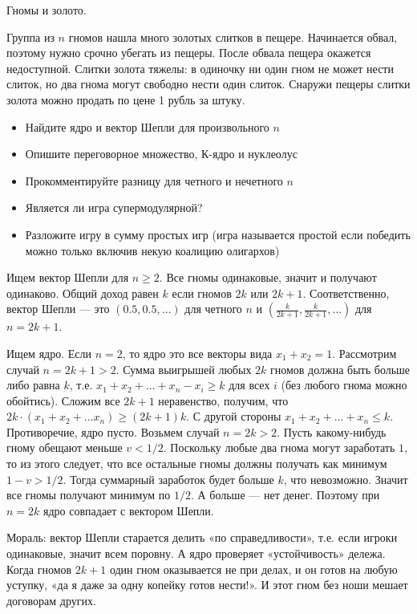 \begin{problem}
Гномы и золото.

 Группа из $n$ гномов нашла много золотых слитков в пещере. Начинается обвал, поэтому нужно срочно убегать из пещеры. После обвала пещера окажется недоступной. Слитки золота тяжелы: в одиночку ни один гном не может нести слиток, но два гнома могут свободно нести один слиток. Снаружи пещеры слитки золота можно продать по цене 1 рубль за штуку.
\begin{itemize}
\item Найдите ядро и вектор Шепли для произвольного $n$
\item Опишите переговорное множество, К-ядро и нуклеолус
\item Прокомментируйте разницу для четного и нечетного $n$
\item Является ли игра супермодулярной?
\item Разложите игру в сумму простых игр (игра называется простой если победить можно только включив некую коалицию олигархов)
\end{itemize}




\begin{sol}
Ищем вектор Шепли для $n\geq 2$. Все гномы одинаковые, значит и получают одинаково. Общий доход равен $k$ если гномов $2k$ или $2k+1$. Соответственно, вектор Шепли — это $(0.5,0.5,\ldots )$ для четного $n$ и $(\frac{k}{2k+1},\frac{k}{2k+1},\ldots )$ для $n=2k+1$.

Ищем ядро. Если $n=2$, то ядро это все векторы вида $x_{1}+x_{2}=1$. Рассмотрим случай $n=2k+1>2$. Сумма выигрышей любых $2k$ гномов должна быть больше либо равна $k$, т.е. $x_{1}+x_{2}+\ldots +x_{n}-x_{i}\geq k$ для всех $i$ (без любого гнома можно обойтись). Сложим все $2k+1$ неравенство, получим, что $2k\cdot (x_{1}+x_{2}+\ldots x_{n})\geq (2k+1)k$. С другой стороны $x_{1}+x_{2}+\ldots +x_{n}\leq k$. Противоречие, ядро пусто. Возьмем случай $n=2k>2$. Пусть какому-нибудь гному обещают меньше $v<1/2$. Поскольку любые два гнома могут заработать $1$, то из этого следует, что все остальные гномы должны получать как минимум $1-v>1/2$. Тогда суммарный заработок будет больше $k$, что невозможно. Значит все гномы получают минимум по $1/2$. А больше  — нет денег. Поэтому при $n=2k$ ядро совпадает с вектором Шепли.

Мораль: вектор Шепли старается делить «по справедливости», т.е. если игроки одинаковые, значит всем поровну. А ядро проверяет «устойчивость» дележа. Когда гномов $2k+1$ один гном оказывается не при делах, и он готов на любую уступку, «да я даже за одну копейку готов нести!». И этот гном без ноши мешает договорам других.
\end{sol}
\end{problem}




